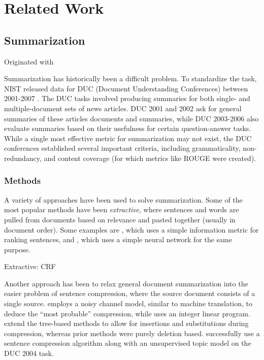 \documentclass[11pt]{article}
\begin{document}
\section{Related Work}

\subsection{Summarization}

Originated with \cite{luhn1958automatic}

Summarization has historically been a difficult problem. To standardize the task, NIST released data for DUC (Document Understanding Conferences) between 2001-2007 \citep{over2007duc}. The DUC tasks involved producing summaries for both single- and multiple-document sets of news articles. DUC 2001 and 2002 ask for general summaries of these articles documents and summaries, while DUC 2003-2006 also evaluate summaries based on their usefulness for certain question-answer tasks. While a single most effective metric for summarization may not exist, the DUC conferences established several important criteria, including grammaticality, non-redundancy, and content coverage (for which metrics like ROUGE \citep{lin2004rouge} were created).

\subsubsection{Methods}

A variety of approaches have been used to solve summarization. Some of the most popular methods have been \emph{extractive}, where sentences and words are pulled from documents based on relevance and pasted together (usually in document order). Some examples are \cite{carbonell1998MMR}, which uses a simple information metric for ranking sentences, and \cite{svore2007ranknet}, which uses a simple neural network for the same purpose.

Extractive: CRF \cite{Shen2004}

Another approach has been to relax general document summarization into the easier problem of sentence compression, where the source document consists of a single source. \cite{knight2002summarization} employs a noisy channel model, similar to machine translation, to deduce the ``most probable'' compression, while \cite{clarke2008global} uses an integer linear program. \cite{cohn2008sentence} extend the tree-based methods to allow for insertions and substitutions during compression, whereas prior methods were purely deletion based. \cite{zajic2004topiary} successfully use a sentence compression algorithm along with an unsupervised topic model on the DUC 2004 task.
\end{document}
